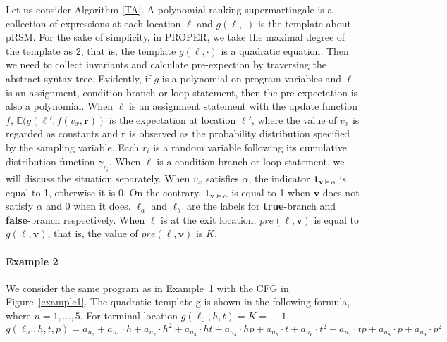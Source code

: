 \documentclass[runningheads]{llncs}
\newcommand\yx[1]{{\color{red} [YD: #1]}}
\begin{document}
Let us consider Algorithm \ref{TA}. A polynomial ranking supermartingale is a collection of expressions at each location $\ell$ and $g(\ell,\cdot)$ is the template about pRSM. For the sake of simplicity, in PROPER, we take the maximal degree of the template as $2$, that is, the template $g(\ell,\cdot)$ is a quadratic equation.
Then we need to collect invariants and calculate pre-expection by traversing the abstract syntax tree. Evidently, if $g$ is a polynomial on program variables and $\ell$ is an assignment, condition-branch or loop statement, then the pre-expectation is also a polynomial. When $\ell$ is an assignment statement with the update function $f$, $\mathbb{E}(g(\ell',f(v_x,\boldsymbol{r}))$ is the expectation at location $\ell'$, where the value of $v_x$ is regarded as constants and $\boldsymbol{r}$ is observed as the probability distribution specified by the sampling variable. Each $r_i$ is a random variable following its cumulative distribution function $\gamma_{r_i}$.
When $\ell$ is a condition-branch or loop statement, we will discuss the situation separately. When  $v_x$ satisfies $\alpha$, the indicator $\textbf{1}_{\boldsymbol{v}\vDash\alpha}$ is equal to 1, otherwise it is 0. On the contrary, $\textbf{1}_{\boldsymbol{v}\nvDash\alpha}$ is equal to 1 when $\boldsymbol{v}$ does not satisfy $\alpha$ and 0 when it does. $\ell_a$ and $\ell_b$ are the labels for \textbf{true}-branch and \textbf{false}-branch respectively. When $\ell$ is at the exit location,  $pre(\ell,\boldsymbol{v})$ is equal to $g(\ell,\boldsymbol{v})$, that is, the value of $pre(\ell,\boldsymbol{v})$ is $K$.

\paragraph{Example 2} 
We consider the same program as in Example~1 with the CFG in Figure~\ref{example1}. The quadratic template g is shown in the following formula, where $n=1,\ldots,5$. For terminal location $g(\ell_6,h,t)\!=\!K\!=\!-1$. 
$$g(\!\ell_n,h,t,p\!)\!=\!a_{n_0}\!+\!a_{n_1}\cdot h\!+\!a_{n_2}\cdot h^{2}\!+\!a_{n_3}\cdot ht \!+\!a_{n_4}\cdot hp\!+\!a_{n_5}\cdot t\!+\!a_{n_6}\cdot t^{2}+\!a_{n_7}\cdot tp\!+\!a_{n_8}\cdot p\!+\!a_{n_9}\cdot p^{2}$$ 
\end{document}
